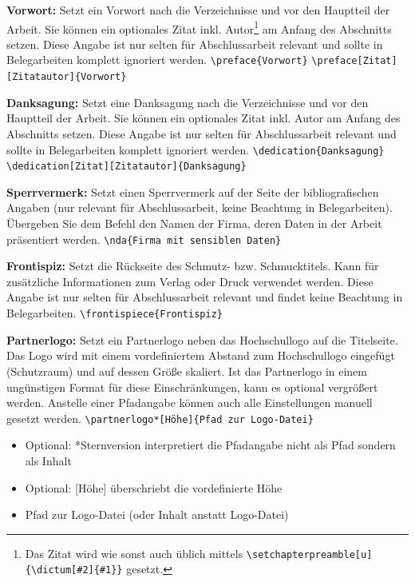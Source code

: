 	\textbf{Vorwort:}\label{cmd:preface}
	Setzt ein Vorwort nach die Verzeichnisse und vor den Hauptteil der Arbeit.
	Sie können ein optionales Zitat inkl. Autor\footnote{\label{ftn:chapterquote}Das Zitat wird wie sonst auch üblich mittels \texttt{\textbackslash{}setchapterpreamble[u]\{\textbackslash{}dictum[\#2]\{\#1\}\}} gesetzt.} am Anfang des Abschnitts setzen.
	Diese Angabe ist nur selten für Abschlussarbeit relevant und sollte in Belegarbeiten komplett ignoriert werden.
	\newline
	\verb|\preface{Vorwort}|
	\newline
	\verb|\preface[Zitat][Zitatautor]{Vorwort}|
	
	\textbf{Danksagung:}\label{cmd:dedication}
	Setzt eine Danksagung nach die Verzeichnisse und vor den Hauptteil der Arbeit.
	Sie können ein optionales Zitat inkl. Autor am Anfang des Abschnitts setzen.
	Diese Angabe ist nur selten für Abschlussarbeit relevant und sollte in Belegarbeiten komplett ignoriert werden.
	\newline
	\verb|\dedication{Danksagung}|
	\newline
	\verb|\dedication[Zitat][Zitatautor]{Danksagung}|
	
	\textbf{Sperrvermerk:}\label{cmd:nda}
	Setzt einen Sperrvermerk auf der Seite der bibliografischen Angaben (nur relevant für Abschlussarbeit, keine Beachtung in Belegarbeiten).
	Übergeben Sie dem Befehl den Namen der Firma, deren Daten in der Arbeit präsentiert werden.
	\newline
	\verb|\nda{Firma mit sensiblen Daten}|
	
	\textbf{Frontispiz:}\label{cmd:frontispiece}
	Setzt die Rückseite des Schmutz- bzw. Schmucktitels.
	Kann für zusätzliche Informationen zum Verlag oder Druck verwendet werden.
	Diese Angabe ist nur selten für Abschlussarbeit relevant und findet keine Beachtung in Belegarbeiten.
	\newline
	\verb|\frontispiece{Frontispiz}|
	
	\textbf{Partnerlogo:}\label{cmd:partnerlogo}
	Setzt ein Partnerlogo neben das Hochschullogo auf die Titelseite.
	Das Logo wird mit einem vordefiniertem Abstand zum Hochschullogo eingefügt (Schutzraum) und auf dessen Größe skaliert.
	Ist das Partnerlogo in einem ungünstigen Format für diese Einschränkungen, kann es optional vergrößert werden.
	Anstelle einer Pfadangabe können auch alle Einstellungen manuell gesetzt werden.
	\newline
	\verb|\partnerlogo*[Höhe]{Pfad zur Logo-Datei}|
	\begin{itemize}
		\item Optional: *Sternversion interpretiert die Pfadangabe nicht als Pfad sondern als Inhalt
		\item Optional: [Höhe] überschriebt die vordefinierte Höhe
		\item Pfad zur Logo-Datei (oder Inhalt anstatt Logo-Datei)
	\end{itemize}
	
